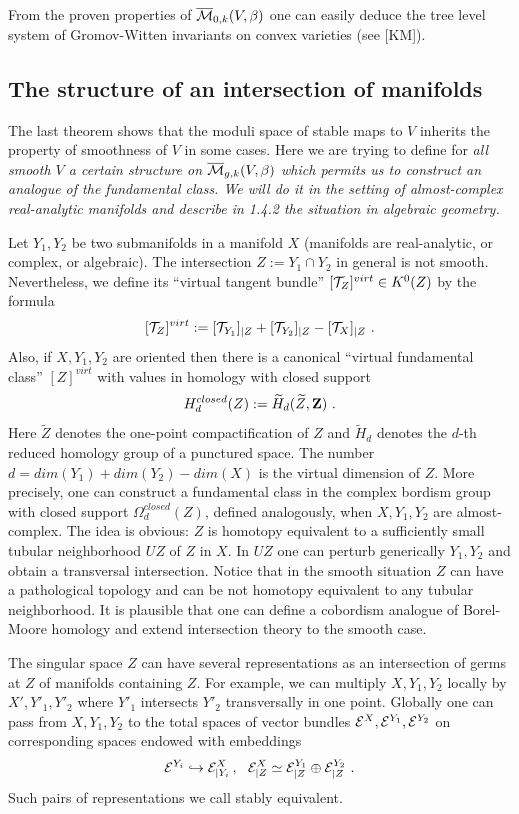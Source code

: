 \documentclass{amsart}
\begin{document}
{}From the proven properties of $\overline{\mathcal{M}}_{0,k}(V,\beta)$ one can easily deduce the
tree level system of Gromov-Witten invariants on convex varieties (see [KM]).


\subsection{The structure of an intersection of manifolds}

The last theorem shows that the moduli space of stable maps to $V$ inherits
 the property of smoothness of $V$ in some cases. Here we are trying to define
 for \it all \rm smooth $V$ a certain structure on $\overline{\mathcal{M}}_{g,k}(V,\beta)$
 which permits us to construct an analogue of the fundamental class.
 We will do it in the setting of almost-complex real-analytic manifolds and
describe in 1.4.2 the situation in algebraic geometry.

Let $Y_1,Y_2$ be two submanifolds in a manifold $X$ (manifolds are
real-analytic, or complex, or algebraic). The intersection $Z:=Y_1\cap Y_2$
 in general is not smooth. Nevertheless, we define its
 ``virtual tangent bundle'' $[\mathcal T_Z]^{virt}\in K^0(Z)$
  by the formula
 $$[\mathcal T_Z]^{virt}:=[\mathcal T_{Y_1}]_{|Z}+[\mathcal T_{Y_2}]_{|Z}-
[\mathcal T_X]_{|Z}\,\,.$$
Also, if $X,Y_1,Y_2$ are oriented then there is a canonical
 ``virtual fundamental class'' $[Z]^{virt}$ with values in homology with closed
support
$$H_d^{closed}(Z):=\widetilde H_d(\widetilde Z,\mathbf Z)\,\,.$$
 Here $\widetilde Z$ denotes the one-point compactification of $Z$ and
$\widetilde H_d$ denotes the $d$-th reduced homology group of a punctured
space. The number $d=dim(Y_1)+dim(Y_2)-dim(X)$ is the virtual dimension of $Z$.
 More precisely, one can construct a fundamental class in the   complex
bordism group  with closed support $\Omega^{closed}_d(Z)$, defined analogously,
when $X,Y_1,Y_2$ are almost-complex. The idea is obvious: $Z$ is homotopy
equivalent to a sufficiently small tubular neighborhood $UZ$ of $Z$ in $X$. In
$UZ$ one can perturb generically $Y_1,Y_2$ and obtain a transversal
intersection. Notice that in the smooth situation $Z$ can have a pathological
topology and can be not homotopy equivalent to any  tubular neighborhood.  It
is plausible that
 one can define a cobordism analogue of Borel-Moore homology
 and extend intersection theory to the smooth case.



The singular space $Z$ can have several representations as an intersection of
germs at $Z$ of manifolds containing $Z$. For example, we can multiply
$X,Y_1,Y_2$
 locally by $X',Y'_1,Y'_2$ where $Y'_1$ intersects $Y'_2$ transversally in one
point. Globally one can pass from $X,Y_1,Y_2$ to the total spaces of vector
bundles $\mathcal E^X,\mathcal E^{Y_1},\mathcal E^{Y_2}$ on corresponding spaces endowed
with embeddings
$$\mathcal E^{Y_i}\hookrightarrow\mathcal E^X_{|Y_i}\,,\,\,\,\,\mathcal  E^X_{|Z}\simeq\mathcal
E^{Y_1}_{|Z}\oplus
\mathcal E^{Y_2}_{|Z}\,\,.$$
Such pairs of representations we call stably equivalent.
\end{document}
